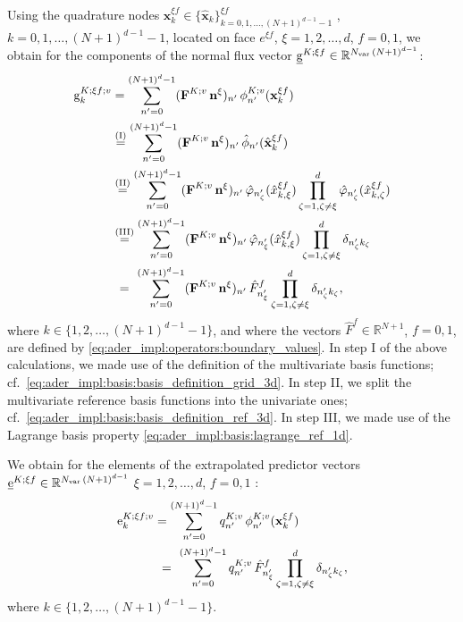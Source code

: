 \documentclass{scrreprt}
\theoremstyle{definition}
\theoremstyle{nonumberplain}
\renewcommand{\vec}[1]{{\textbf{#1}}}
\newcommand{\laVec}[1]{\underline{\mathrm{#1}}}
\newcommand{\laVecel}[1]{\mathrm{#1}}
\newcommand{\cell}{K}
\newcommand{\refVec}[1]{\hat{\vec{#1}}}
\begin{document}
Using the quadrature nodes
$\vec{x}^{\xi f}_k\in\{\refVec{x}_{k}\}_{k=0,1,\ldots,(N+1)^{d-1}-1}^{\xi f}$
,$k=0,1,\ldots,(N+1)^{d-1}-1$,
located on face $e^{\xi f}$,
$\xi=1,2,\ldots,d$, $f=0,1$,
we obtain for the components of the normal flux vector
$\laVec{g}^{K;\xi f}\in\mathbb{R}^{N_\textup{var}\,(N+1)^{d-1}}$:
\begin{align*}
\laVecel{g}^{K;\xi f;v}_k
&=
\sum_{n'=0}^{(N+1)^{d}-1}
(\vec{F}^{\cell;v}\,\vec{n}^{\xi})_{n'}\,
\phi^{\cell;v}_{n'}(\vec{x}^{\xi f}_k)
\\
&
\overset{\textup{(I)}}
{=}
\sum_{n'=0}^{(N+1)^{d}-1}
(\vec{F}^{\cell;v}\,\vec{n}^{\xi})_{n'}\,
\hat{\phi}_{n'}(\refVec{x}^{\xi f}_k)
\\
&
\overset{\textup{(II)}}
{=}
\sum_{n'=0}^{(N+1)^{d}-1}
(\vec{F}^{\cell;v}\,\vec{n}^{\xi})_{n'}\,
\hat{\varphi}_{n'_\zeta}(\hat{x}^{\xi f}_{k,\xi})
\prod_{\zeta=1,\zeta\neq\xi}^{d}
\hat{\varphi}_{n'_\zeta}(\hat{x}^{\xi f}_{k,\zeta})
\\
&
\overset{\textup{(III)}}
{=}
\sum_{n'=0}^{(N+1)^{d}-1}
(\vec{F}^{\cell;v}\,\vec{n}^{\xi})_{n'}\,
\hat{\varphi}_{n'_\xi}(\hat{x}^{\xi f}_{k,\xi})
\prod_{\zeta=1,\zeta\neq\xi}^{d}
\delta_{n'_\zeta k_\zeta}
\\
&
\overset{\phantom{\textup{(IV)}}}
{=}
\sum_{n'=0}^{(N+1)^{d}-1}
(\vec{F}^{\cell;v}\,\vec{n}^{\xi})_{n'}\,
\hat{F}^f_{n'_\xi}
\prod_{\zeta=1,\zeta\neq\xi}^{d}
\delta_{n'_\zeta k_\zeta},
\end{align*}
where $k\in\{1,2,\ldots,(N+1)^{d-1}-1\}$, and
where the vectors $\hat{F}^f \in \mathbb{R}^{N+1}$,
$f=0,1$, are defined by \eqref{eq:ader_impl:operators:boundary_values}.
In step I of the above calculations, we made use of the definition of the
multivariate basis functions; cf.~\eqref{eq:ader_impl:basis:basis_definition_grid_3d}.
In step II, we split the multivariate reference basis functions
into the univariate ones; cf.~\eqref{eq:ader_impl:basis:basis_definition_ref_3d}.
In step III, we made use of the Lagrange basis property
\eqref{eq:ader_impl:basis:lagrange_ref_1d}.

We obtain for the elements of the extrapolated
predictor vectors $\laVec{e}^{K;\xi
f}\in\mathbb{R}^{N_\textup{var}\,(N+1)^{d-1}}$ $\xi=1,2,\ldots,d$, $f=0,1$
:
\begin{align*}
\laVecel{e}^{K;\xi f;v}_{k}
&=
\sum_{n'=0}^{(N+1)^{d}-1}
q^{\cell;v}_{n'}\,
\phi^{\cell;v}_{n'}(\vec{x}^{\xi f}_k)
\\
&
\overset{\phantom{\textup{(IV)}}}
{=}
\sum_{n'=0}^{(N+1)^{d}-1}
q^{\cell;v}_{n'}\,
\hat{F}^f_{n'_\xi}
\prod_{\zeta=1,\zeta\neq\xi}^{d}
\delta_{n'_\zeta k_\zeta},
\end{align*}
where $k\in\{1,2,\ldots,(N+1)^{d-1}-1\}$.
\end{document}
